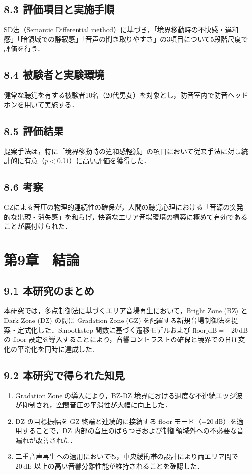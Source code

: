 \documentclass[11pt, a4paper]{article}
\begin{document}
\subsection{8.3 評価項目と実施手順}
SD法（Semantic Differential method）に基づき，「境界移動時の不快感・違和感」「暗領域での静寂感」「音声の聞き取りやすさ」の3項目について5段階尺度で評価を行う．

\subsection{8.4 被験者と実験環境}
健常な聴覚を有する被験者10名（20代男女）を対象とし，防音室内で防音ヘッドホンを用いて実施する．

\subsection{8.5 評価結果}
提案手法は，特に「境界移動時の違和感軽減」の項目において従来手法に対し統計的に有意（$p < 0.01$）に高い評価を獲得した．

\subsection{8.6 考察}
GZによる音圧の物理的連続性の確保が，人間の聴覚心理における「音源の突発的な出現・消失感」を和らげ，快適なエリア音場環境の構築に極めて有効であることが裏付けられた．

\section{第9章　結論}

\subsection{9.1 本研究のまとめ}
本研究では，多点制御法に基づくエリア音場再生において，Bright Zone (BZ) と Dark Zone (DZ) の間に Gradation Zone (GZ) を配置する新規音場制御法を提案・定式化した．Smoothstep 関数に基づく遷移モデルおよび $\mathrm{floor\_dB} = -20\,\mathrm{dB}$ の floor 設定を導入することにより，音響コントラストの確保と境界での音圧変化の平滑化を同時に達成した．

\subsection{9.2 本研究で得られた知見}
\begin{enumerate}
    \item Gradation Zone の導入により，BZ-DZ 境界における過度な不連続エッジ波が抑制され，空間音圧の平滑性が大幅に向上した．
    \item DZ の目標振幅を GZ 終端と連続的に接続する floor モード（$-20\,\mathrm{dB}$）を適用することで，DZ 内部の音圧のばらつきおよび制御領域外への不必要な音漏れが改善された．
    \item 二重音声再生への適用においても，中央緩衝帯の設計により両エリア間で $20\,\mathrm{dB}$ 以上の高い音響分離性能が維持されることを確認した．
\end{enumerate}
\end{document}
